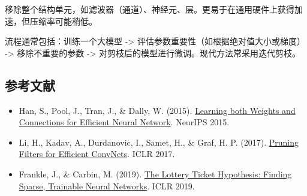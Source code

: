移除整个结构单元，如滤波器（通道）、神经元、层。更易于在通用硬件上获得加速，但压缩率可能稍低。

流程通常包括：训练一个大模型 -\textgreater{} 评估参数重要性（如根据绝对值大小或梯度） -\textgreater{} 移除不重要的参数 -\textgreater{} 对剪枝后的模型进行微调。现代方法常采用迭代剪枝。

\hypertarget{ux53c2ux8003ux6587ux732e-90}{%
\subsection{参考文献}\label{ux53c2ux8003ux6587ux732e-90}}

\vspace{0.25em}
\begin{itemize}
\tightlist
\item
  Han, S., Pool, J., Tran, J., \& Dally, W. (2015). \href{https://papers.nips.cc/paper_files/paper/2015/hash/ae0eb3eed39d2bcef4622b2499a05fe6-Abstract.html}{Learning both Weights and Connections for Efficient Neural Network}. NeurIPS 2015.
\item
  Li, H., Kadav, A., Durdanovic, I., Samet, H., \& Graf, H. P. (2017). \href{https://openreview.net/forum?id=rJqFGTslg}{Pruning Filters for Efficient ConvNets}. ICLR 2017.
\item
  Frankle, J., \& Carbin, M. (2019). \href{https://openreview.net/forum?id=rJl-b3RcF7}{The Lottery Ticket Hypothesis: Finding Sparse, Trainable Neural Networks}. ICLR 2019.
\end{itemize}

\clearpage

